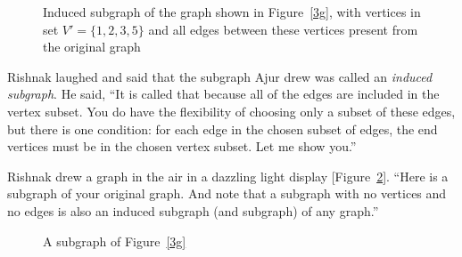 \begin{figure}
\begin{center}
\caption{Induced subgraph of the graph shown in Figure~\ref{3g}, with vertices in set $V'=\{1,2,3,5\}$ and all edges between these vertices present from the original graph}\label{3g1}
\end{center}
\end{figure}

Rishnak laughed and said that the subgraph Ajur drew was called an \textit{induced subgraph}. He said, ``It is called that because all of the edges are included in the vertex subset. You do have the flexibility of choosing only a subset of these edges, but there is one condition: for each edge in the chosen subset of edges, the end vertices must be in the chosen vertex subset. Let me show you.''

Rishnak drew a graph in the air in a dazzling light display [Figure~\ref{3g2}]. ``Here is a subgraph of your original graph. And note that a subgraph with no vertices and no edges is also an induced subgraph (and subgraph) of any graph.''

\begin{figure}
\begin{center}
\caption{A subgraph of Figure~\ref{3g}}\label{3g2}
\end{center}
\end{figure}



